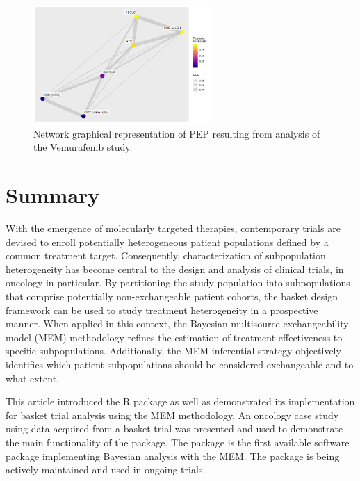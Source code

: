 		\begin{figure}[htbp!]
			\centering
			\includegraphics[width=0.6\textwidth]{PEPNetwork.png}
			\caption{Network graphical representation of PEP resulting from analysis of the Vemurafenib study.}
			\label{Figure_PEPNetwork}
		\end{figure}
		
\section{Summary}


With the emergence of molecularly targeted therapies, contemporary trials are devised to enroll potentially heterogeneous patient populations defined by a common treatment target. Consequently, characterization of subpopulation heterogeneity has become central to the design and analysis of clinical trials, in oncology in particular. By partitioning the study population into subpopulations that comprise potentially non-exchangeable patient cohorts, the basket design framework can be used to study treatment heterogeneity in a prospective manner. When applied in this context, the Bayesian multisource exchangeability model (MEM) methodology refines the estimation of treatment effectiveness to specific subpopulations. Additionally, the MEM inferential strategy objectively identifies which patient subpopulations should be considered exchangeable and to what extent.

This article introduced the R package  as well as demonstrated its implementation for basket trial analysis using the MEM methodology. An oncology case study using data acquired from a basket trial was presented and used to demonstrate the main functionality of the package. The  package is the first available software package implementing Bayesian analysis with the MEM. The package is being actively maintained and used in ongoing trials.

